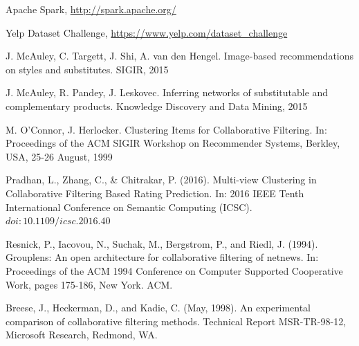 \documentclass[conference]{IEEEtran}
\begin{document}
\begin{thebibliography}{1}

Apache Spark, \url{http://spark.apache.org/}

Yelp Dataset Challenge, \url{https://www.yelp.com/dataset_challenge}

J. McAuley, C. Targett, J. Shi, A. van den Hengel. Image-based recommendations on styles and substitutes. SIGIR, 2015

J. McAuley, R. Pandey, J. Leskovec. Inferring networks of substitutable and complementary products. Knowledge Discovery and Data Mining, 2015

M. O’Connor, J. Herlocker. Clustering Items for Collaborative Filtering. In: Proceedings of the ACM SIGIR Workshop on Recommender Systems, Berkley, USA, 25-26 August, 1999

Pradhan, L., Zhang, C., \& Chitrakar, P. (2016). Multi-view Clustering in Collaborative Filtering Based Rating Prediction. In: 2016 IEEE Tenth International Conference on Semantic Computing (ICSC). $doi:10.1109/icsc.2016.40$

Resnick, P., Iacovou, N., Suchak, M., Bergstrom, P., and Riedl, J. (1994). Grouplens: An open architecture for collaborative filtering of netnews. In: Proceedings of the ACM 1994 Conference on Computer Supported Cooperative Work, pages 175-186, New York. ACM.

Breese, J., Heckerman, D., and Kadie, C. (May, 1998). An experimental comparison of collaborative filtering methods. Technical Report MSR-TR-98-12, Microsoft Research, Redmond, WA.

\end{thebibliography}
\end{document}
